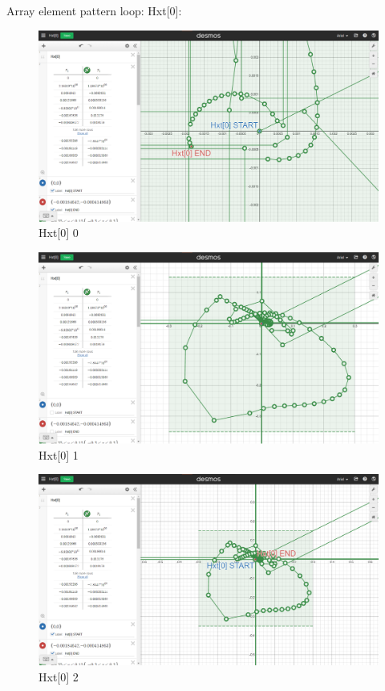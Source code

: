 Array element pattern loop:
Hxt[0]:
\begin{figure}[H]
    \includegraphics[width=\columnwidth]{figs/Hxt[0]_0}
    \caption{Hxt[0] 0}
\end{figure}
\begin{figure}[H]
    \includegraphics[width=\columnwidth]{figs/Hxt[0]_1}
    \caption{Hxt[0] 1}
\end{figure}
\begin{figure}[H]
    \includegraphics[width=\columnwidth]{figs/Hxt[0]_2}
    \caption{Hxt[0] 2}
\end{figure}
